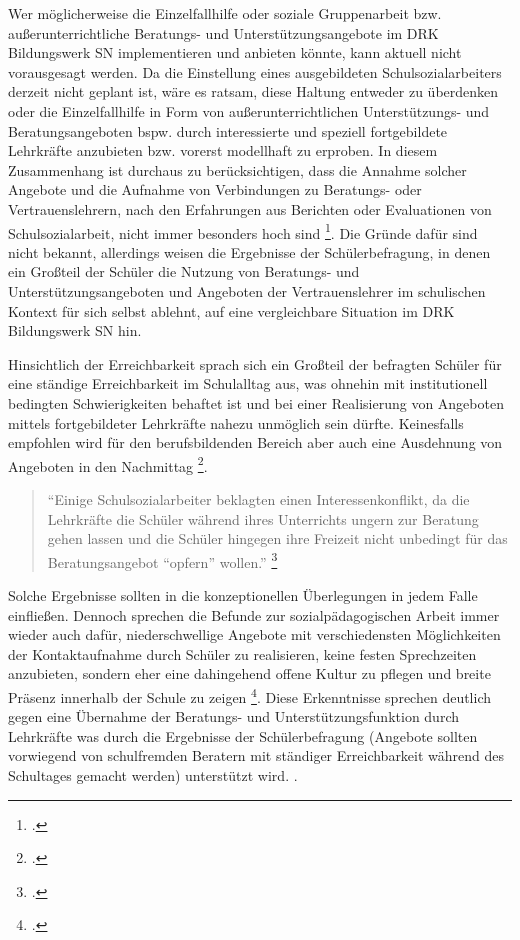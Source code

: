 Wer möglicherweise die Einzelfallhilfe oder soziale Gruppenarbeit bzw. außerunterrichtliche Beratungs- und Unterstützungsangebote im DRK Bildungswerk SN implementieren und anbieten könnte, kann aktuell nicht vorausgesagt werden. Da die Einstellung eines ausgebildeten Schulsozialarbeiters derzeit nicht geplant ist, wäre es ratsam, diese Haltung entweder zu überdenken oder die Einzelfallhilfe in Form von außerunterrichtlichen Unterstützungs- und Beratungsangeboten bspw. durch interessierte und speziell fortgebildete Lehrkräfte anzubieten bzw. vorerst modellhaft zu erproben. In diesem Zusammenhang ist durchaus zu berücksichtigen, dass die Annahme solcher Angebote und die Aufnahme von Verbindungen zu Beratungs- oder Vertrauenslehrern, nach den Erfahrungen aus Berichten oder Evaluationen von Schulsozialarbeit, nicht immer besonders hoch sind \footcite[vgl.][17f]{LSS2004}. Die Gründe dafür sind nicht bekannt, allerdings weisen die Ergebnisse der Schülerbefragung, in denen ein Großteil der Schüler die Nutzung von Beratungs- und Unterstützungsangeboten und Angeboten der Vertrauenslehrer im schulischen Kontext für sich selbst ablehnt, auf eine vergleichbare Situation im DRK Bildungswerk SN hin. 

Hinsichtlich der Erreichbarkeit sprach sich ein Großteil der  befragten Schüler für eine ständige Erreichbarkeit im Schulalltag aus, was ohnehin mit institutionell bedingten Schwierigkeiten behaftet ist und bei einer Realisierung von Angeboten mittels fortgebildeter Lehrkräfte nahezu unmöglich sein dürfte. Keinesfalls empfohlen wird für den berufsbildenden Bereich aber auch eine Ausdehnung von Angeboten in den  Nachmittag \footcite[vgl.][17f]{LSS2004}.

\begin{quotation}
\noindent
"`Einige Schulsozialarbeiter beklagten einen Interessenkonflikt, da die Lehrkräfte die Schüler während ihres Unterrichts ungern zur Beratung gehen lassen und die Schüler hingegen ihre Freizeit nicht unbedingt für das Beratungsangebot "`opfern"' wollen."' \footcite[93]{Ganser2004}
\end{quotation}

\noindent
Solche Ergebnisse sollten in die konzeptionellen Überlegungen in jedem Falle einfließen. Dennoch sprechen die Befunde zur sozialpädagogischen Arbeit immer wieder auch dafür, niederschwellige Angebote mit verschiedensten Möglichkeiten der Kontaktaufnahme durch Schüler zu realisieren, keine festen Sprechzeiten anzubieten, sondern eher eine dahingehend offene Kultur zu pflegen und breite Präsenz innerhalb der Schule zu zeigen \footcite[vgl.][48]{Essers2012}. Diese Erkenntnisse sprechen deutlich gegen eine Übernahme der Beratungs- und Unterstützungsfunktion durch Lehrkräfte was durch die Ergebnisse der Schülerbefragung (Angebote sollten vorwiegend von schulfremden Beratern mit ständiger Erreichbarkeit während des Schultages gemacht werden) unterstützt wird. .

